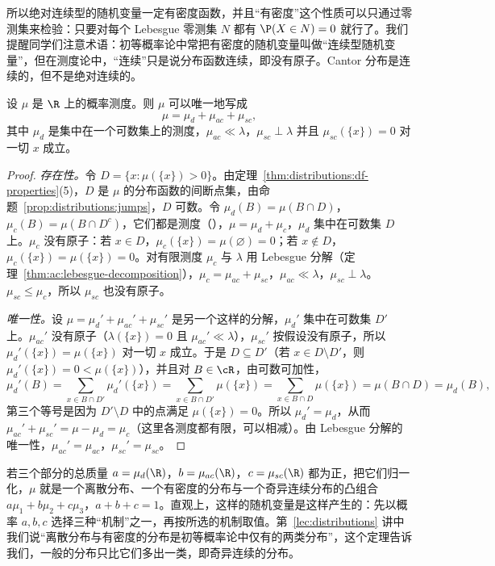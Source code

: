 所以绝对连续型的随机变量一定有密度函数，并且“有密度”这个性质可以只通过零测集来检验：只要对每个 Lebesgue 零测集 $N$ 都有 $\P(X\in N)=0$ 就行了。我们提醒同学们注意术语：初等概率论中常把有密度的随机变量叫做“连续型随机变量”，但在测度论中，“连续”只是说分布函数连续，即没有原子。Cantor 分布是连续的，但不是绝对连续的。

\begin{theorem}[分布的分解]\label{thm:ac:decomposition-distributions}
设 $\mu$ 是 $\R$ 上的概率测度。则 $\mu$ 可以唯一地写成
\[
\mu=\mu_d+\mu_{ac}+\mu_{sc},
\]
其中 $\mu_d$ 是集中在一个可数集上的测度，$\mu_{ac}\ll\lambda$，$\mu_{sc}\perp\lambda$ 并且 $\mu_{sc}(\{x\})=0$ 对一切 $x$ 成立。
\end{theorem}
\begin{proof}
\emph{存在性。}令 $D=\{x:\mu(\{x\})>0\}$。由定理~\ref{thm:distributions:df-properties}(5)，$D$ 是 $\mu$ 的分布函数的间断点集，由命题~\ref{prop:distributions:jumps}，$D$ 可数。令 $\mu_d(B)=\mu(B\cap D)$，$\mu_c(B)=\mu(B\cap D^c)$，它们都是测度（），$\mu=\mu_d+\mu_c$，$\mu_d$ 集中在可数集 $D$ 上。$\mu_c$ 没有原子：若 $x\in D$，$\mu_c(\{x\})=\mu(\varnothing)=0$；若 $x\notin D$，$\mu_c(\{x\})=\mu(\{x\})=0$。对有限测度 $\mu_c$ 与 $\lambda$ 用 Lebesgue 分解（定理~\ref{thm:ac:lebesgue-decomposition}），$\mu_c=\mu_{ac}+\mu_{sc}$，$\mu_{ac}\ll\lambda$，$\mu_{sc}\perp\lambda$。$\mu_{sc}\leqslant\mu_c$，所以 $\mu_{sc}$ 也没有原子。

\emph{唯一性。}设 $\mu=\mu_d'+\mu_{ac}'+\mu_{sc}'$ 是另一个这样的分解，$\mu_d'$ 集中在可数集 $D'$ 上。$\mu_{ac}'$ 没有原子（$\lambda(\{x\})=0$ 且 $\mu_{ac}'\ll\lambda$），$\mu_{sc}'$ 按假设没有原子，所以 $\mu_d'(\{x\})=\mu(\{x\})$ 对一切 $x$ 成立。于是 $D\subseteq D'$（若 $x\in D\setminus D'$，则 $\mu_d'(\{x\})=0<\mu(\{x\})$），并且对 $B\in\cR$，由可数可加性，
\[
\mu_d'(B)=\sum_{x\in B\cap D'}\mu_d'(\{x\})=\sum_{x\in B\cap D'}\mu(\{x\})=\sum_{x\in B\cap D}\mu(\{x\})=\mu(B\cap D)=\mu_d(B),
\]
第三个等号是因为 $D'\setminus D$ 中的点满足 $\mu(\{x\})=0$。所以 $\mu_d'=\mu_d$，从而 $\mu_{ac}'+\mu_{sc}'=\mu-\mu_d=\mu_c$（这里各测度都有限，可以相减）。由 Lebesgue 分解的唯一性，$\mu_{ac}'=\mu_{ac}$，$\mu_{sc}'=\mu_{sc}$。
\end{proof}

若三个部分的总质量 $a=\mu_d(\R)$，$b=\mu_{ac}(\R)$，$c=\mu_{sc}(\R)$ 都为正，把它们归一化，$\mu$ 就是一个离散分布、一个有密度的分布与一个奇异连续分布的凸组合 $a\mu_1+b\mu_2+c\mu_3$，$a+b+c=1$。直观上，这样的随机变量是这样产生的：先以概率 $a,b,c$ 选择三种“机制”之一，再按所选的机制取值。第~\ref{lec:distributions} 讲中我们说“离散分布与有密度的分布是初等概率论中仅有的两类分布”，这个定理告诉我们，一般的分布只比它们多出一类，即奇异连续的分布。


